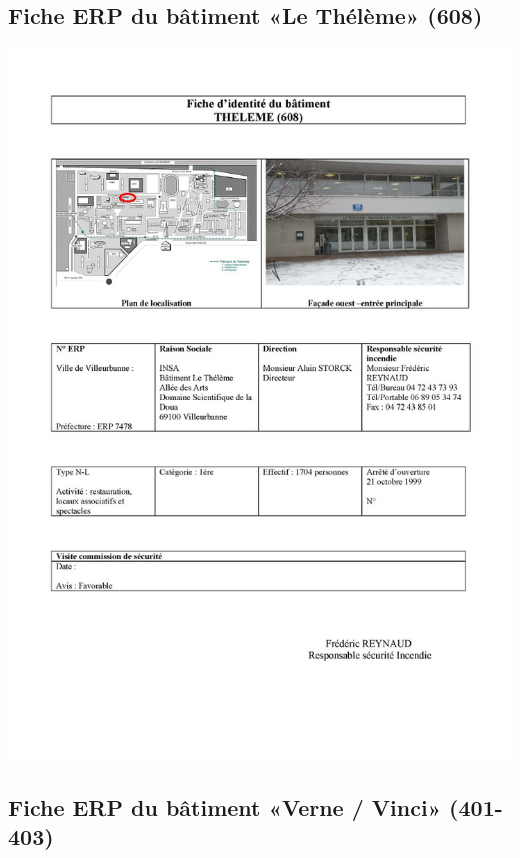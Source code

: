 \documentclass[hidelinks, paper=a4, fontsize=13pt]{report}
\begin{document}
\subsection{Fiche ERP du bâtiment «Le Thélème» (608)}
\begin{center}
\includegraphics[scale=0.5]{Annexes/Documents/ERPTheleme}
\end{center}

\subsection{Fiche ERP du bâtiment «Verne / Vinci» (401-403)}
\end{document}
